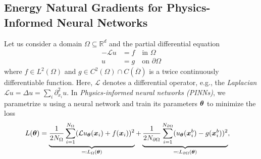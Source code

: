 \subsection{Energy Natural Gradients for Physics-Informed Neural Networks}
Let us consider a domain $\Omega\subseteq\mathbb R^d$ and the partial differential equation %
\begin{align*}\tag{PE}\label{eq:PE}
  -\mathcal{L} u & = f \quad \text{in }\Omega \\
  u & = g \quad \text{on }\partial\Omega
\end{align*}
where $f\in L^2(\Omega)$ and $g\in C^2(\Omega)\cap C(\overline{\Omega})$ is a twice continuously differentiable function.
Here, $\mathcal{L}$ denotes a differential operator, e.g., the \emph{Laplacian} $\mathcal{L} u = \Delta u = \sum_i \partial_{x_i}^2 u$.
In \emph{Physics-informed neural networks (PINNs)}, we parametrize $u$ using a neural network and train its parameters ${\bm{\theta}}$ to minimize the loss 
\begin{align}\label{eq:pinn-loss}
  L({\bm{\theta}})
  &=
    \underbrace{\frac{1}{2N_\Omega} \sum_{i=1}^{N_\Omega} (\mathcal{L} u_{\bm{\theta}}({\bm{x}}_i) + f({\bm{x}}_i))^2}_{\eqqcolon L_\Omega({\bm{\theta}})} + \underbrace{\frac{1}{2N_{\partial\Omega}}\sum_{i=1}^{N_{\partial\Omega}} ( u_{\bm{\theta}}({\bm{x}}^b_i) - g({\bm{x}}^b_i))^2}_{\eqqcolon L_{\partial\Omega}({\bm{\theta}})},
\end{align}
